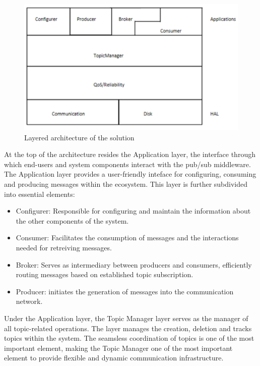 \begin{figure}[H]
    \centering
    \includegraphics[width=1.0\textwidth]{Figures/architecture_layers.png}
    \caption{Layered architecture of the solution}
\end{figure}

At the top of the architecture resides the Application layer, the interface
through which end-users and system components interact with the pub/sub
middleware. The Application layer provides a user-friendly inteface for
configuring, consuming and producing messages within the ecosystem.
This layer is further subdivided into essential elements:

\begin{itemize}
    \item   Configurer: Responsible for configuring and maintain the
            information about the other components of the system.
    \item   Consumer: Facilitates the consumption of messages and the
            interactions needed for retreiving messages.
    \item   Broker: Serves as intermediary between producers and consumers,
            efficiently routing messages based on established topic
            subscription.
    \item   Producer: initiates the generation of messages into the
            communication network.
\end{itemize}

Under the Application layer, the Topic Manager layer serves as the manager of
all topic-related operations. The layer manages the creation, deletion and
tracks topics within the system. The seamsless coordination of topics is one
of the most important element, making the Topic Manager one of the most
important element to provide flexible and dynamic communication infrastructure.

